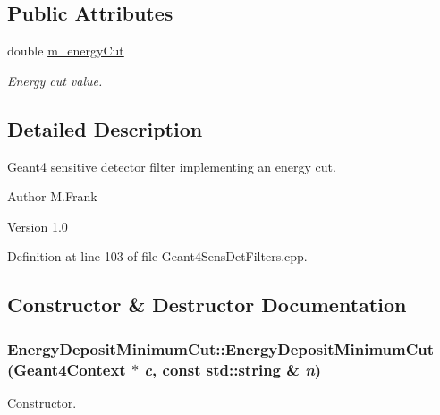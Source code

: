 \subsection*{Public Attributes}
\begin{DoxyCompactItemize}
\item 
double \hyperlink{struct_d_d4hep_1_1_simulation_1_1_energy_deposit_minimum_cut_a465b72d5d4e13d7f3555cfdfc1947697}{m\_\-energyCut}
\begin{DoxyCompactList}\small\item\em Energy cut value. \item\end{DoxyCompactList}\end{DoxyCompactItemize}


\subsection{Detailed Description}
Geant4 sensitive detector filter implementing an energy cut. \begin{DoxyAuthor}{Author}
M.Frank 
\end{DoxyAuthor}
\begin{DoxyVersion}{Version}
1.0 
\end{DoxyVersion}


Definition at line 103 of file Geant4SensDetFilters.cpp.

\subsection{Constructor \& Destructor Documentation}
\hypertarget{struct_d_d4hep_1_1_simulation_1_1_energy_deposit_minimum_cut_a5abe4000163bf6533035fc26ebfb8642}{
\subsubsection[{EnergyDepositMinimumCut}]{\setlength{\rightskip}{0pt plus 5cm}EnergyDepositMinimumCut::EnergyDepositMinimumCut ({\bf Geant4Context} $\ast$ {\em c}, \/  const std::string \& {\em n})}}
\label{struct_d_d4hep_1_1_simulation_1_1_energy_deposit_minimum_cut_a5abe4000163bf6533035fc26ebfb8642}


Constructor. 


